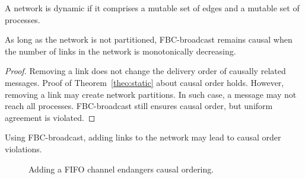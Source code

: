 
\begin{definition}
  A network is dynamic if it comprises a mutable set of edges and a mutable set
  of processes.
\end{definition}

\begin{theorem}
  As long as the network is not partitioned, FBC-broadcast remains causal when
  the number of links in the network is monotonically decreasing.

\end{theorem}

\begin{proof}
  Removing a link does not change the delivery order of causally related
  messages. Proof of Theorem~\ref{theo:static} about causal order holds.
  However, removing a link may create network partitions. In such case, a
  message may not reach all processes. FBC-broadcast still ensures causal order,
  but uniform agreement is violated.
\end{proof}

\begin{theorem}
  Using FBC-broadcast, adding links to the network may lead to causal order
  violations.
\end{theorem}

\begin{figure}
  \begin{center}
    
    \caption{\label{fig:problem}Adding a FIFO channel endangers causal
      ordering.}
  \end{center}
\end{figure}

